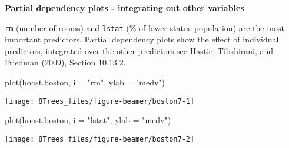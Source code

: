 \documentclass[
  10pt,
  ignorenonframetext,
]{beamer}
\newenvironment{Shaded}{\begin{snugshade}}{\end{snugshade}}
\newcommand{\AttributeTok}[1]{\textcolor[rgb]{0.77,0.63,0.00}{#1}}
\newcommand{\FunctionTok}[1]{\textcolor[rgb]{0.00,0.00,0.00}{#1}}
\newcommand{\NormalTok}[1]{#1}
\newcommand{\StringTok}[1]{\textcolor[rgb]{0.31,0.60,0.02}{#1}}
\begin{document}
\begin{frame}[fragile]
\textbf{Partial dependency plots - integrating out other variables }

\small

\texttt{rm} (number of rooms) and \texttt{lstat} (\% of lower status
population) are the most important predictors. Partial dependency plots
show the effect of individual predictors, integrated over the other
predictors see Hastie, Tibshirani, and Friedman (2009), Section 10.13.2.

\vspace{2mm}

\scriptsize

\begin{Shaded}
\begin{Highlighting}[]
\FunctionTok{plot}\NormalTok{(boost.boston, }\AttributeTok{i =} \StringTok{"rm"}\NormalTok{, }\AttributeTok{ylab =} \StringTok{"medv"}\NormalTok{)}
\end{Highlighting}
\end{Shaded}

\begin{center}\texttt{[image: 8Trees\_files/figure-beamer/boston7-1]} \end{center}

\begin{Shaded}
\begin{Highlighting}[]
\FunctionTok{plot}\NormalTok{(boost.boston, }\AttributeTok{i =} \StringTok{"lstat"}\NormalTok{, }\AttributeTok{ylab =} \StringTok{"medv"}\NormalTok{)}
\end{Highlighting}
\end{Shaded}

\begin{center}\texttt{[image: 8Trees\_files/figure-beamer/boston7-2]} \end{center}
\end{frame}
\end{document}
